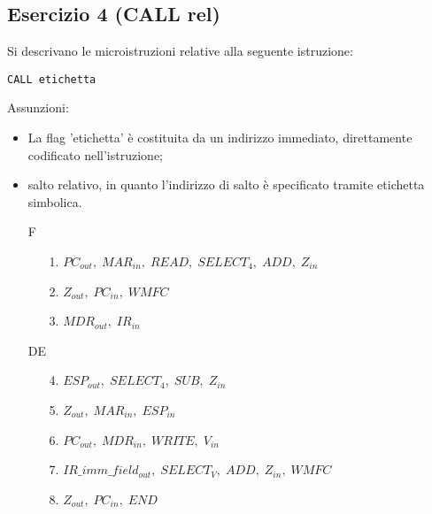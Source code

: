 \documentclass[a4paper]{article}
\theoremstyle{break}
\theoremstyle{break}
\theoremstyle{break}
\theoremstyle{break}
\begin{document}
\subsection{Esercizio 4 (CALL rel)}
\begin{exercise}
  Si descrivano le microistruzioni relative alla seguente istruzione:
  \begin{center}
    \texttt{CALL etichetta}
  \end{center}
  Assunzioni:
  \begin{itemize}
    \item 
      La flag 'etichetta' è costituita da un indirizzo immediato, direttamente codificato 
      nell'istruzione;
    \item salto relativo, in quanto l'indirizzo di salto è specificato tramite 
      etichetta simbolica.
  \end{itemize}

  \begin{enumerate}
    \item [F]
      \begin{enumerate}
        \item [1.] \( PC_{out},\; MAR_{in},\; READ,\; SELECT_4,\; ADD,\; Z_{in} \) 
        \item [2.] \( Z_{out},\; PC_{in},\; WMFC \) 
        \item [3.] \( MDR_{out},\; IR_{in} \) 
      \end{enumerate}
    \item [DE]
      \begin{enumerate}
        \item [4.] \( ESP_{out},\; SELECT_4,\; SUB,\; Z_{in} \)
        \item [5.] \( Z_{out},\; MAR_{in},\; ESP_{in}\) 
        \item [6.] \( PC_{out},\; MDR_{in},\; WRITE,\; V_{in} \) 
        \item [7.] \( IR\_imm\_field_{out},\; SELECT_V,\; ADD,\; Z_{in},\; WMFC \) 
        \item [8.] \( Z_{out},\; PC_{in},\; END \) 
      \end{enumerate}
  \end{enumerate}
\end{exercise}
\end{document}
